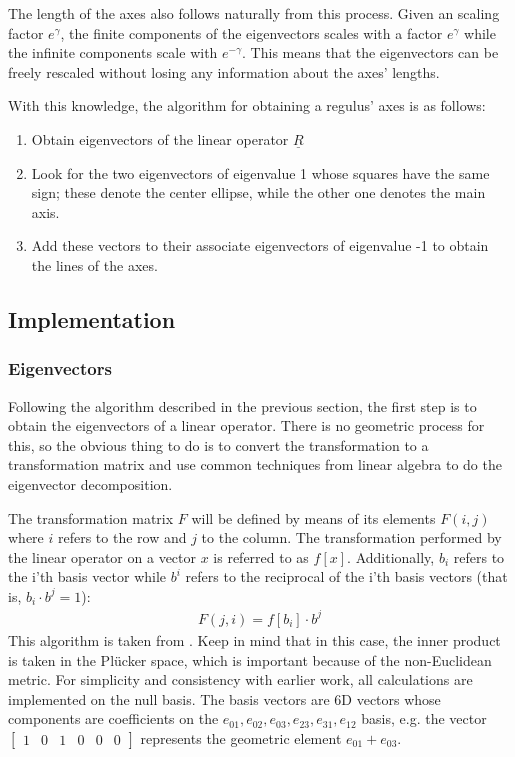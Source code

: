 \documentclass[a4paper, 10pt]{article}
\begin{document}
The length of the axes also follows naturally from this process. Given an
scaling factor $e^\gamma$, the finite components of the eigenvectors scales with
a factor $e^\gamma$ while the infinite components scale with
$e^{-\gamma}$\cite{dorst2013versors}. This
means that the eigenvectors can be freely rescaled without losing any
information about the axes' lengths.

With this knowledge, the algorithm for obtaining a regulus' axes is as follows:
\begin{enumerate}
  \item Obtain eigenvectors of the linear operator $\underline{R}$
  \item Look for the two eigenvectors of eigenvalue 1 whose squares have the
    same sign; these denote the center ellipse, while the other one denotes the
    main axis.
  \item Add these vectors to their associate eigenvectors of eigenvalue -1 to
    obtain the lines of the axes.
\end{enumerate}

\subsection{Implementation}
\subsubsection{Eigenvectors}
Following the algorithm described in the previous section, the first step is to
obtain the eigenvectors of a linear operator. There is no geometric process for
this, so the obvious thing to do is to convert the transformation to a
transformation matrix and use common techniques from linear algebra to do the
eigenvector decomposition. 

The transformation matrix $F$ will be defined by means of its elements $F(i, j)$
where $i$ refers to the row and $j$ to the column. The transformation performed
by the linear operator on a vector $x$ is referred to as $f[x]$. Additionally,
$b_i$ refers to the i'th basis vector while $b^i$ refers to the reciprocal of
the i'th basis vectors (that is, $b_i \cdot b^j = 1$):
\begin{align}
  F(j, i) = f[b_i] \cdot b^j \label{eq:matrix}
\end{align}
This algorithm is taken from \cite{dorst2009geometric}. Keep in mind that in
this case, the inner product is taken in the Pl\"{u}cker space, which is
important because of the non-Euclidean metric. For simplicity and consistency with earlier
work, all calculations are implemented on the null basis. The basis vectors are
6D vectors whose components are coefficients on the ${e_{01}, e_{02}, e_{03},
  e_{23}, e_{31}, e_{12}}$ basis, e.g. the vector $\begin{bmatrix} 1 & 0 & 1 & 0
  & 0 & 0 \end{bmatrix}$ represents the geometric element $e_{01} + e_{03}$.
\end{document}
